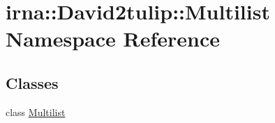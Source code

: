 \hypertarget{namespaceirna_1_1David2tulip_1_1Multilist}{
\section{irna\-:\-:\-David2tulip\-:\-:\-Multilist \-Namespace \-Reference}
\label{namespaceirna_1_1David2tulip_1_1Multilist}
}
\subsection*{\-Classes}
\begin{DoxyCompactItemize}
\item 
class \hyperlink{classirna_1_1David2tulip_1_1Multilist_1_1Multilist}{\-Multilist}
\end{DoxyCompactItemize}
